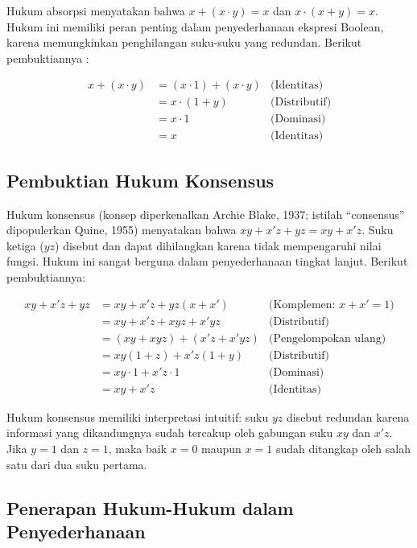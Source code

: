 Hukum absorpsi menyatakan bahwa $x + (x \cdot y) = x$ dan $x \cdot (x + y) = x$. Hukum ini memiliki peran penting dalam penyederhanaan ekspresi Boolean, karena memungkinkan penghilangan suku-suku yang redundan. Berikut pembuktiannya \cite{rosen2019}:

\begin{align*}
x + (x \cdot y) &= (x \cdot 1) + (x \cdot y) & \text{(Identitas)} \\
                 &= x \cdot (1 + y) & \text{(Distributif)} \\
                 &= x \cdot 1 & \text{(Dominasi)} \\
                 &= x & \text{(Identitas)}
\end{align*}

\subsection{Pembuktian Hukum Konsensus}

Hukum konsensus (konsep diperkenalkan Archie Blake, 1937; istilah ``consensus'' dipopulerkan Quine, 1955) menyatakan bahwa $xy + x'z + yz = xy + x'z$. Suku ketiga ($yz$) disebut  dan dapat dihilangkan karena tidak mempengaruhi nilai fungsi. Hukum ini sangat berguna dalam penyederhanaan tingkat lanjut. Berikut pembuktiannya:

\begin{align*}
xy + x'z + yz &= xy + x'z + yz(x + x') & \text{(Komplemen: } x + x' = 1) \\
              &= xy + x'z + xyz + x'yz & \text{(Distributif)} \\
              &= (xy + xyz) + (x'z + x'yz) & \text{(Pengelompokan ulang)} \\
              &= xy(1 + z) + x'z(1 + y) & \text{(Distributif)} \\
              &= xy \cdot 1 + x'z \cdot 1 & \text{(Dominasi)} \\
              &= xy + x'z & \text{(Identitas)}
\end{align*}

\begin{konsep}
Hukum konsensus memiliki interpretasi intuitif: suku $yz$ disebut redundan karena informasi yang dikandungnya sudah tercakup oleh gabungan suku $xy$ dan $x'z$. Jika $y = 1$ dan $z = 1$, maka baik $x = 0$ maupun $x = 1$ sudah ditangkap oleh salah satu dari dua suku pertama.
\end{konsep}

\subsection{Penerapan Hukum-Hukum dalam Penyederhanaan}

